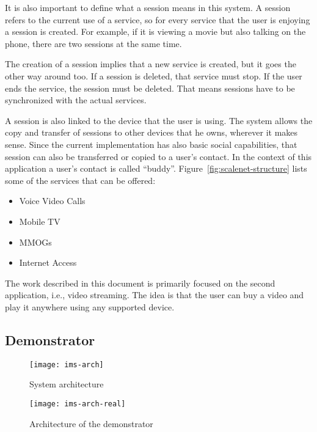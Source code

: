 It is also important to define what a session means in this system.
A session refers to the current use of a service, so for every service that the user is enjoying a session is created.
For example, if it is viewing a movie but also talking on the  phone, there are two sessions at the same time.

The creation of a session implies that a new service is created, but it goes the other way around too.
If a session is deleted, that service must stop.
If the user ends the service, the session must be deleted.
That means sessions have to be synchronized with the actual services.

A session is also linked to the device that the user is using.
The system allows the copy and transfer of sessions to other devices that he owns, wherever it makes sense.
Since the current implementation has also basic social capabilities, that session can also be transferred or copied to a user's contact.
In the context of this application a user's contact is called ``buddy''.
Figure~\ref{fig:scalenet-structure} lists some of the services that can be offered:

\begin{itemize}
  \item Voice \et{} Video Calls
  \item Mobile TV \et{} 
  \item {}\acp{MMOG}
  \item Internet Access
\end{itemize}

The work described in this document is primarily focused on the second application, i.e., video streaming.
The idea is that the user can buy a video and play it anywhere using any supported device.


\subsection{ Demonstrator} %
\label{sub:demonstrator}

\begin{figure}[p]
  \centering
    \texttt{[image: ims-arch]}
  \caption{System architecture}
  \label{fig:ims-arch}
\end{figure}

\begin{figure}[p]
  \centering
    \texttt{[image: ims-arch-real]}
  \caption{Architecture of the demonstrator}
  \label{fig:ims-arch-real}
\end{figure}

